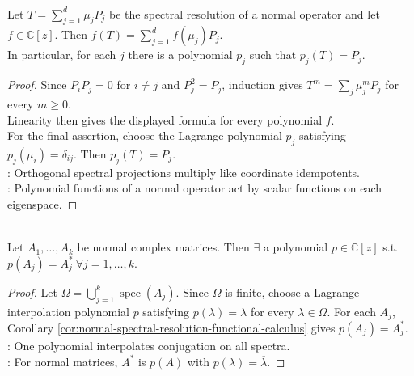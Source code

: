 \begin{corollary} \label{cor:normal-spectral-resolution-functional-calculus} \\
Let $T=\sum_{j=1}^{d}\mu_jP_j$ be the spectral resolution of a normal operator and let $f\in\mathbb{C}[z]$. Then $f(T)=\sum\limits_{j=1}^{d}f(\mu_j)P_j$.\\
In particular, for each $j$ there is a polynomial $p_j$ such that $p_j(T)=P_j$.
\begin{proof}
Since $P_iP_j=0$ for $i\neq j$ and $P_j^2=P_j$, induction gives $T^m=\sum_j\mu_j^mP_j$ for every $m\geq0$.\\
Linearity then gives the displayed formula for every polynomial $f$.\\
For the final assertion, choose the Lagrange polynomial $p_j$ satisfying $p_j(\mu_i)=\delta_{ij}$. Then $p_j(T)=P_j$.\\
: Orthogonal spectral projections multiply like coordinate idempotents.\\
: Polynomial functions of a normal operator act by scalar functions on each eigenspace.
\end{proof}
\end{corollary}

\begin{lemma} \label{lem:adjoints-of-finitely-many-normal-matrices-polynomial} \\
Let $A_1,\ldots,A_k$ be normal complex matrices. Then $\exists$ a polynomial $p\in\mathbb{C}[z]$ s.t. $p(A_j)=A_j^* \ \forall j=1,\ldots,k$.
\begin{proof}
Let $\Omega=\bigcup\limits_{j=1}^{k}\operatorname{spec}(A_j)$. Since $\Omega$ is finite, choose a Lagrange interpolation polynomial $p$ satisfying $p(\lambda)=\overline{\lambda}$ for every $\lambda\in\Omega$. For each $A_j$, Corollary \ref{cor:normal-spectral-resolution-functional-calculus} gives $p(A_j)=A_j^*$.\\
: One polynomial interpolates conjugation on all spectra.\\
: For normal matrices, $A^*$ is $p(A)$ with $p(\lambda)=\overline{\lambda}$.
\end{proof}
\end{lemma}

